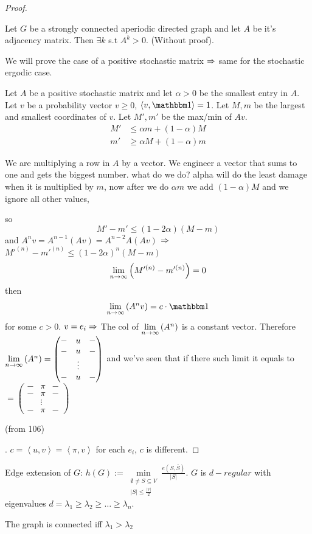 \begin{proof}
$ $
\begin{lemma}
Let $G$ be a strongly connected aperiodic directed graph and let
$A$ be it's adjacency matrix. Then $\exists k$ s.t $A^{k}>0$. (Without
proof).
\end{lemma}

We will prove the case of a positive stochastic matrix $\Rightarrow$ same
for the stochastic ergodic case.

Let $A$ be a positive stochastic matrix and let $\alpha>0$ be the
smallest entry in $A$. Let $v$ be a probability vector $v\ge0$,
$\left\langle v,\one\right\rangle =1$. Let $M,m$ be the largest
and smallest coordinates of $v$. Let $M',m'$ be the max/min of $Av$.
\begin{align*}
M' & \le\alpha m+\left(1-\alpha\right)M\\
m' & \ge\alpha M+\left(1-\alpha\right)m
\end{align*}
\begin{insight}
We are multiplying a row in $A$ by a vector. We engineer a vector
that sums to one and gets the biggest number. what do we do? alpha
will do the least damage when it is multiplied by $m$, now after
we do $\alpha m$ we add $\left(1-\alpha\right)M$ and we ignore all
other values, %
\end{insight}
{} so 
\[
M'-m'\le\left(1-2\alpha\right)\left(M-m\right)
\]
and $A^{n}v=A^{n-1}\left(Av\right)=A^{n-2}A\left(Av\right)$ $\Rightarrow$
$M'^{\left(n\right)}-m'^{\left(n\right)}\le\left(1-2\alpha\right)^{n}\left(M-m\right)$
\[
\lim\limits _{n\to\infty}\left(M'^{\left(n\right)}-m'^{\left(n\right)}\right)=0
\]
 then 
\[
\limn{A^{n}v}=c\cdot\one
\]
 for some $c>0$. $v=e_{i}\Rightarrow$ The col of $\lim\limits _{n\to\infty}\left(A^{n}\right)$ is a
constant vector. Therefore $\lim\limits _{n\to\infty}\left(A^{n}\right)=\begin{pmatrix}- & u & -\\
- & u & -\\
 & \vdots\\
- & u & -
\end{pmatrix}$ and we've seen that if there such limit it equals to $=\begin{pmatrix}- & \pi & -\\
- & \pi & -\\
 & \vdots\\
- & \pi & -
\end{pmatrix}$ %
\begin{insight}
(from 106)%
\end{insight}
. $c=\left\langle u,v\right\rangle =\left\langle \pi,v\right\rangle $
for each $e_{i}$, $c$ is different.
\end{proof}
%
Edge extension of $G$: $h\left(G\right):=\min\limits _{\begin{array}{c}
\emptyset\ne S\subseteq V\\
\left|S\right|\le\frac{\left|V\right|}{2}
\end{array}}\frac{e\left(S,\overline{S}\right)}{\left|S\right|}$. $G$ is $d-regular$ with eigenvalues $d=\lambda_{1}\ge\lambda_{2}\ge\dots\ge\lambda_{n}$.
\begin{insight}
The graph is connected iff $\lambda_{1}>\lambda_{2}$%
\end{insight}

